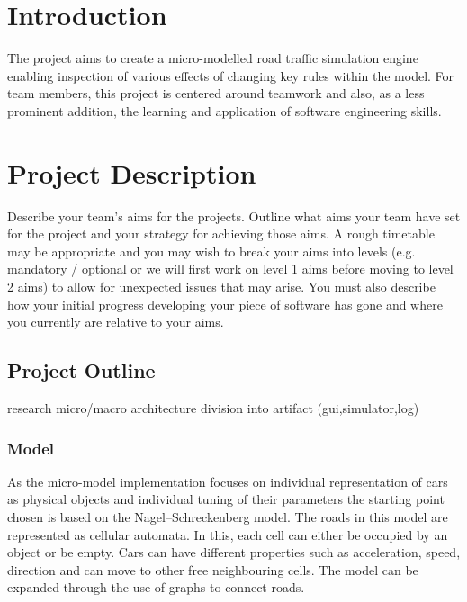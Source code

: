 
\section{Introduction}

The project aims to create a micro-modelled road traffic simulation engine enabling inspection of various effects of changing key rules within the model. For team members, this project is centered around teamwork and also, as a less prominent addition, the learning and application of software engineering skills.

\section{Project Description} %
Describe your team’s aims for the projects. Outline what aims your team have set for the project and your strategy for
achieving those aims. A rough timetable may be appropriate and you may wish to break your aims into levels
 (e.g. mandatory / optional or we will first work on level 1 aims before moving to level 2 aims) to allow for
 unexpected issues that may arise. You must also describe how your initial progress developing your piece of software
 has gone and where you currently are relative to your aims.
 

\subsection{Project Outline}


research micro/macro
architecture
division into artifact (gui,simulator,log)




\subsubsection{Model}

As the micro-model implementation focuses on individual representation of cars as physical objects and individual tuning of their parameters the starting point chosen is based on the Nagel–Schreckenberg model. The roads in this model are represented as cellular automata\cite{Schreckenberg}. In this, each cell can either be occupied by an object or be empty. Cars can have different properties such as acceleration, speed, direction and can move to other free neighbouring cells. The model can be expanded through the use of graphs to connect roads.


